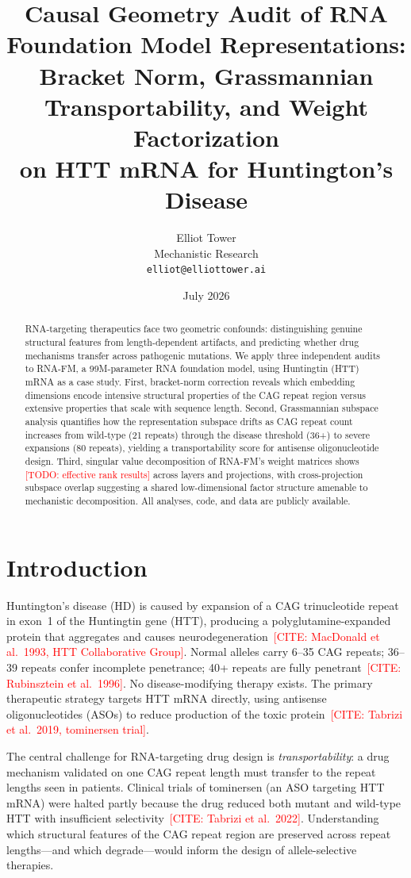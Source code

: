 \documentclass[11pt]{article}
\title{Causal Geometry Audit of RNA Foundation Model Representations:\\
  Bracket Norm, Grassmannian Transportability, and Weight Factorization\\
  on HTT mRNA for Huntington's Disease}
\author{Elliot Tower\\
  Mechanistic Research\\
  \texttt{elliot@elliottower.ai}}
\date{July 2026}
\newcommand{\TODO}[1]{\textcolor{red}{[TODO: #1]}}
\newcommand{\CITE}[1]{\textcolor{red}{[CITE: #1]}}
\begin{document}
\maketitle

\begin{abstract}
RNA-targeting therapeutics face two geometric confounds: distinguishing
genuine structural features from length-dependent artifacts, and
predicting whether drug mechanisms transfer across pathogenic mutations.
We apply three independent audits to RNA-FM, a 99M-parameter RNA
foundation model, using Huntingtin (HTT) mRNA as a case study.
%
First, bracket-norm correction reveals which embedding dimensions encode
intensive structural properties of the CAG repeat region versus
extensive properties that scale with sequence length.
%
Second, Grassmannian subspace analysis quantifies how the
representation subspace drifts as CAG repeat count increases from
wild-type (21 repeats) through the disease threshold (36+) to severe
expansions (80 repeats), yielding a transportability score for
antisense oligonucleotide design.
%
Third, singular value decomposition of RNA-FM's weight matrices shows
\TODO{effective rank results} across layers and projections, with
cross-projection subspace overlap suggesting a shared low-dimensional
factor structure amenable to mechanistic decomposition.
%
All analyses, code, and data are publicly available.
\end{abstract}

\section{Introduction}
\label{sec:intro}

Huntington's disease (HD) is caused by expansion of a CAG trinucleotide
repeat in exon~1 of the Huntingtin gene (HTT), producing a
polyglutamine-expanded protein that aggregates and causes
neurodegeneration~\CITE{MacDonald et al.~1993, HTT Collaborative Group}.
Normal alleles carry 6--35 CAG repeats; 36--39 repeats confer incomplete
penetrance; 40+ repeats are fully penetrant~\CITE{Rubinsztein et al.~1996}.
No disease-modifying therapy exists. The primary therapeutic strategy
targets HTT mRNA directly, using antisense oligonucleotides (ASOs) to
reduce production of the toxic protein~\CITE{Tabrizi et al.~2019, tominersen trial}.

The central challenge for RNA-targeting drug design is \emph{transportability}:
a drug mechanism validated on one CAG repeat length must transfer to the
repeat lengths seen in patients. Clinical trials of tominersen
(an ASO targeting HTT mRNA) were halted partly because the drug reduced
both mutant and wild-type HTT with insufficient selectivity~\CITE{Tabrizi et al.~2022}.
Understanding which structural features of the CAG repeat region are
preserved across repeat lengths---and which degrade---would inform
the design of allele-selective therapies.
\end{document}
